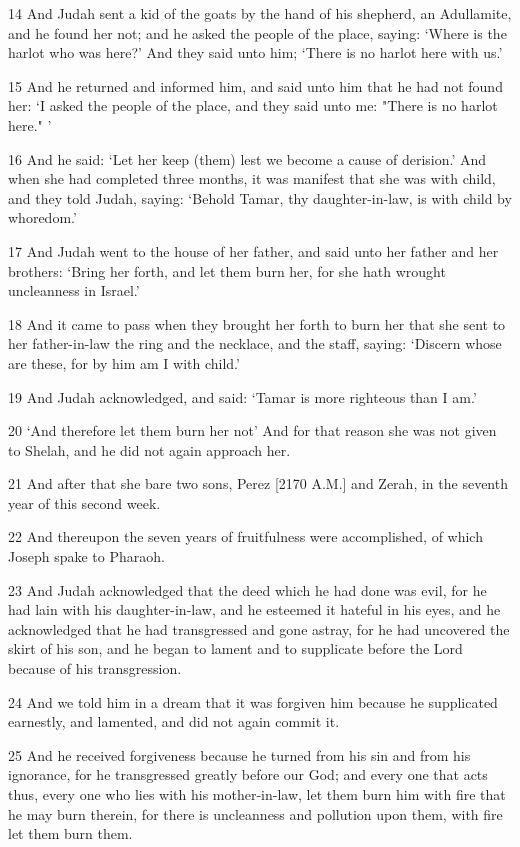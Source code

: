 \par 14 And Judah sent a kid of the goats by the hand of his shepherd, an Adullamite, and he found her not; and he asked the people of the place, saying: ‘Where is the harlot who was here?’ And they said unto him; ‘There is no harlot here with us.’
\par 15 And he returned and informed him, and said unto him that he had not found her: ‘I asked the people of the place, and they said unto me: "There is no harlot here." ’
\par 16 And he said: ‘Let her keep (them) lest we become a cause of derision.’ And when she had completed three months, it was manifest that she was with child, and they told Judah, saying: ‘Behold Tamar, thy daughter-in-law, is with child by whoredom.’
\par 17 And Judah went to the house of her father, and said unto her father and her brothers: ‘Bring her forth, and let them burn her, for she hath wrought uncleanness in Israel.’
\par 18 And it came to pass when they brought her forth to burn her that she sent to her father-in-law the ring and the necklace, and the staff, saying: ‘Discern whose are these, for by him am I with child.’
\par 19 And Judah acknowledged, and said: ‘Tamar is more righteous than I am.’
\par 20 ‘And therefore let them burn her not’ And for that reason she was not given to Shelah, and he did not again approach her.
\par 21 And after that she bare two sons, Perez [2170 A.M.] and Zerah, in the seventh year of this second week.
\par 22 And thereupon the seven years of fruitfulness were accomplished, of which Joseph spake to Pharaoh.
\par 23 And Judah acknowledged that the deed which he had done was evil, for he had lain with his daughter-in-law, and he esteemed it hateful in his eyes, and he acknowledged that he had transgressed and gone astray, for he had uncovered the skirt of his son, and he began to lament and to supplicate before the Lord because of his transgression.
\par 24 And we told him in a dream that it was forgiven him because he supplicated earnestly, and lamented, and did not again commit it.
\par 25 And he received forgiveness because he turned from his sin and from his ignorance, for he transgressed greatly before our God; and every one that acts thus, every one who lies with his mother-in-law, let them burn him with fire that he may burn therein, for there is uncleanness and pollution upon them, with fire let them burn them.
